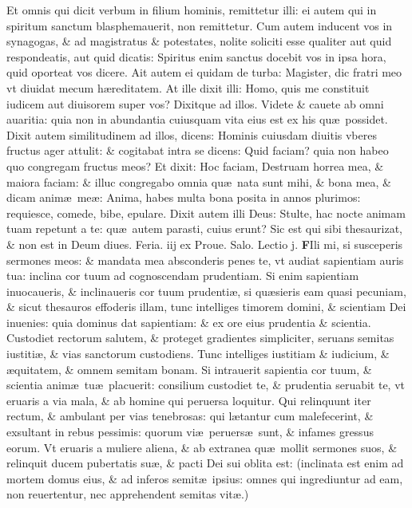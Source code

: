 \documentclass[a5paper,10pt]{book}
\def\rightmarginnote{%
	\lrmarginnote{\hskip\columnwidth \hskip -1em}}
\def\ae{æ}
\begin{document}
\begin{multicols*}{2}
Et omnis qui dicit verbum in filium hominis, remittetur illi: ei autem qui in spiritum sanctum blasphemauerit, non remittetur.
Cum autem inducent vos in synagogas, \& ad magistratus \& potestates, nolite soliciti esse qualiter aut quid respondeatis, aut quid dicatis: Spiritus enim sanctus docebit vos in ipsa hora, quid oporteat vos dicere.
Ait autem ei quidam de turba: Magister, dic fratri meo vt diuidat mecum h\ae reditatem.
At ille dixit illi: Homo, quis me constituit iudicem aut diuisorem super vos?
Dixitque ad illos. Videte \& cauete ab omni auaritia: quia non in abundantia cuiusquam vita eius est ex his qu\ae \ possidet.
Dixit autem similitudinem ad illos, dicens: Hominis cuiusdam diuitis vberes fructus ager attulit: \& cogitabat intra se dicens: Quid faciam? quia non habeo quo congregam fructus meos?
Et dixit: Hoc faciam, Destruam horrea mea, \& maiora faciam: \& illuc congregabo omnia qu\ae \ nata sunt mihi, \& bona mea, \& dicam anim\ae \ me\ae : Anima, habes multa bona posita in annos plurimos: requiesce, comede, bibe, epulare.
Dixit autem illi Deus: Stulte, hac nocte animam tuam repetunt a te: qu\ae \ autem parasti, cuius erunt?
Sic est qui sibi thesaurizat, \& non est in Deum diues.
\newline {} \color{red} \hypertarget{TUE-PRIMA-POST-ADV}{Feria. iij} ex Proue. Salo. \hfill Lectio j. \color{black}
\vspace{-1.25em}
\lettrine[lines=2]{\bfseries F}{}Ili\rightmarginnote{ca. 2.} mi, si susceperis sermones meos: \& mandata mea absconderis penes te, vt audiat sapientiam auris tua: inclina cor tuum ad cognoscendam prudentiam.
Si enim sapientiam inuocaueris, \& inclinaueris cor tuum prudenti\ae , si qu\ae sieris eam quasi pecuniam, \& sicut thesauros effoderis illam, tunc intelliges timorem
domini, \& scientiam Dei inuenies: quia dominus dat sapientiam: \& ex ore eius prudentia \& scientia.
Custodiet rectorum salutem, \& proteget gradientes simpliciter, seruans semitas iustiti\ae , \& vias sanctorum custodiens.
Tunc intelliges iustitiam \& iudicium, \& \ae quitatem, \& omnem semitam bonam.
Si intrauerit sapientia cor tuum, \& scientia anim\ae \ tu\ae \ placuerit: consilium custodiet te, \& prudentia seruabit te, vt eruaris a via mala, \& ab homine qui peruersa loquitur.
Qui relinquunt iter rectum, \& ambulant per vias tenebrosas: qui l\ae tantur cum malefecerint, \& exsultant in rebus pessimis: quorum vi\ae \ peruers\ae \ sunt, \& infames gressus eorum.
Vt eruaris a muliere aliena, \& ab extranea qu\ae \ mollit sermones suos, \& relinquit ducem pubertatis su\ae , \& pacti Dei sui oblita est: (inclinata est enim ad mortem domus eius, \& ad inferos semit\ae \ ipsius: omnes qui ingrediuntur ad eam, non reuertentur, nec apprehendent semitas vit\ae .)

\end{multicols*}
\end{document}
